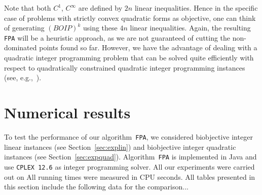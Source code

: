 \documentclass[preprint,12pt]{elsarticle}
\newtheorem{proposition}[theorem]{Proposition}
\def\Z{\mathbb{Z}}
\begin{document}
Note that both $C^1$, $C^\infty$ are defined by $2n$ linear inequalities.
Hence in the specific case of problems with strictly convex quadratic forms as objective,
one can think of generating $(BOIP)^k$ using these $4n$ linear inequalities.
Again, the resulting \texttt{FPA} will be a heuristic approach, as we are not guaranteed
of cutting the non-dominated points found so far. However, we have the advantage of dealing with a quadratic integer programming
problem that can be solved quite efficiently with respect
to quadratically constrained quadratic integer programming instances (see, e.g.,~\cite{buchheim:2016}).




\section{Numerical results}\label{sec:numres}
To test the performance of our algorithm~\texttt{FPA}, we considered biobjective integer linear instances (see Section~\ref{sec:explin}) and
biobjective integer quadratic instances (see Section~\ref{sec:expquad}).
Algorithm~\texttt{FPA} is implemented in Java and use \texttt{CPLEX 12.6}  as integer programming solver.
All our experiments were carried out on
All running times were measured in CPU seconds.
All tables presented in this section include the following data for the
comparison...
\end{document}
